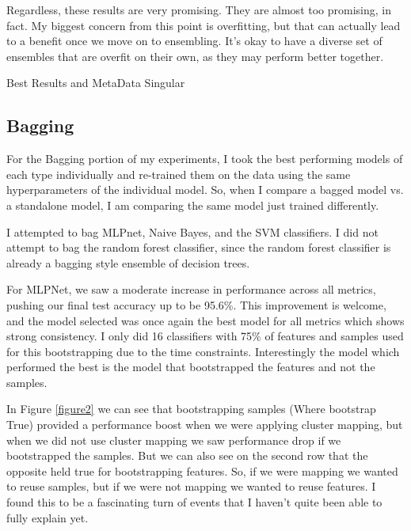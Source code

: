 \documentclass[12pt]{article}
\begin{document}
Regardless, these results are very promising. They are almost too promising, in fact. My biggest concern from this point is overfitting, but 
that can actually lead to a benefit once we move on to ensembling. It's okay to have a diverse set of ensembles that are overfit on their own, 
as they may perform better together. 


\begin{table}
  \resizebox*{.95\textwidth}{!}{}
  \caption{Best Results and MetaData Singular}
  \label{table1}
\end{table}

\subsection{Bagging}
For the Bagging portion of my experiments, I took the best performing models of each type individually and re-trained them on 
the data using the same hyperparameters of the individual model. So, when I compare a bagged model vs. a standalone model, I am 
comparing the same model just trained differently.

I attempted to bag MLPnet, Naive Bayes, and the SVM classifiers. I did not attempt to bag the random forest classifier, since the 
random forest classifier is already a bagging style ensemble of decision trees. 

For MLPNet, we saw a moderate increase in performance across all metrics, pushing our final test accuracy up to be 95.6\%. This improvement 
is welcome, and the model selected was once again the best model for all metrics which shows strong consistency. I only did 16 classifiers
with 75\% of features and samples used 
for this bootstrapping due to the time constraints. Interestingly the model which performed the best is the model that bootstrapped the 
features and not the samples. 

In Figure \ref{figure2} we can see that bootstrapping samples (Where bootstrap True) provided a performance boost when we were applying 
cluster mapping, but when we did not use cluster mapping we saw performance drop if we bootstrapped the samples. But we can also see on the second row that 
the opposite held true for bootstrapping features. So, if we were mapping we wanted to reuse samples, but if we were not mapping we wanted 
to reuse features. I found this to be a fascinating turn of events that I haven't quite been able to fully explain yet. 
\end{document}
